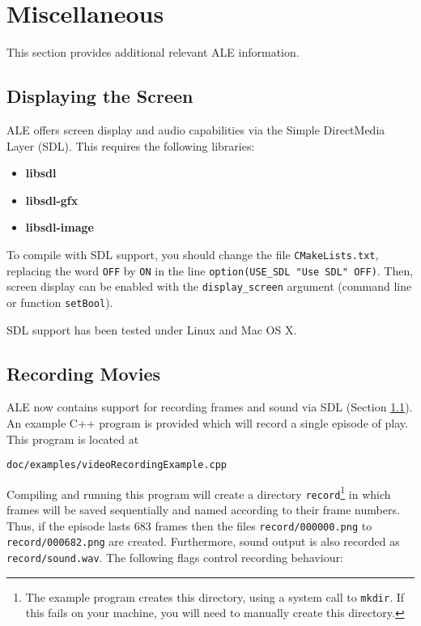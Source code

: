 \documentclass[12pt]{article}
\begin{document}
\section{Miscellaneous}

This section provides additional relevant ALE information.

\subsection{Displaying the Screen}\label{subsec:displaying_screen}

ALE offers screen display and audio capabilities via the Simple DirectMedia Layer (SDL).
This requires the following libraries:

\begin{itemize}
  \item{\textbf{libsdl}}
  \item{\textbf{libsdl-gfx}}
  \item{\textbf{libsdl-image}}
\end{itemize}

To compile with SDL support, you should change the file \verb+CMakeLists.txt+, replacing
the word \verb+OFF+ by \verb+ON+ in the line \verb+option(USE_SDL "Use SDL" OFF)+.
Then, screen display can be enabled with the \verb+display_screen+ argument (command line
or function \verb+setBool+). 

SDL support has been tested under Linux and Mac OS X. 

\subsection{Recording Movies}

ALE now contains support for recording frames and sound via SDL (Section \ref{subsec:displaying_screen}).
An example C++ program is provided which will record a single episode of play. This program is located at

\begin{center}
\texttt{doc/examples/videoRecordingExample.cpp}
\end{center}

Compiling and running this program will create a directory \texttt{record}\footnote{The example program creates this directory, using a system call to \texttt{mkdir}. If this fails on your machine, you will need to manually create this directory.} in which frames will be saved sequentially and named according to their frame numbers. Thus, if the episode lasts 683 frames then the files \verb+record/000000.png+ to \verb+record/000682.png+ are created. Furthermore, sound output is also recorded as \verb+record/sound.wav+. The following flags control recording behaviour:
\end{document}
